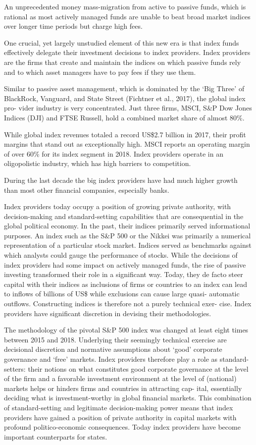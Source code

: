 \documentclass[
]{book}
\begin{document}
An unprecedented
money mass-migration from active to passive funds, which is rational as most
actively managed funds are unable to beat broad market indices over longer time
periods but charge high fees.

One crucial, yet largely unstudied element of this new era is that
index funds effectively delegate their investment decisions to index providers. Index
providers are the firms that create and maintain the indices on which passive funds
rely and to which asset managers have to pay fees if they use them.

Similar to passive asset management, which is dominated by the `Big Three' of
BlackRock, Vanguard, and State Street (Fichtner et al., 2017), the global index pro-
vider industry is very concentrated. Just three firms, MSCI, S\&P Dow Jones Indices
(DJI) and FTSE Russell, hold a combined market share of almost 80\%.

While global index revenues totaled a record US\$2.7 billion in 2017,
their profit margins that stand out as exceptionally high.
MSCI reports an operating margin of over 60\% for its index segment in 2018.
Index providers operate in an oligopolistic industry,
which has high barriers to competition.

During the last decade the big index providers have had
much higher growth than most other financial companies, especially banks.

Index providers today occupy a position of growing
private authority, with decision-making and standard-setting capabilities that are
consequential in the global political economy. In the past, their indices primarily
served informational purposes. An index such as the S\&P 500 or the Nikkei was
primarily a numerical representation of a particular stock market. Indices served as
benchmarks against which analysts could gauge the performance of stocks. While
the decisions of index providers had some impact on actively managed funds, the
rise of passive investing transformed their role in a significant way. Today, they de
facto steer capital with their indices as inclusions of firms or countries to an
index can lead to inflows of billions of US\$ while exclusions can cause large quasi-
automatic outflows. Constructing indices is therefore not a purely technical exer-
cise. Index providers have significant discretion in devising their methodologies.

The methodology of the pivotal S\&P 500
index was changed at least eight times between 2015 and 2018. Underlying their
seemingly technical exercise are decisional discretion and normative assumptions
about `good' corporate governance and `free' markets. Index providers therefore
play a role as standard-setters: their notions on what constitutes good corporate
governance at the level of the firm and a favorable investment environment at the
level of (national) markets helps or hinders firms and countries in attracting cap-
ital, essentially deciding what is investment-worthy in global financial markets.
This combination of standard-setting and legitimate decision-making power means
that index providers have gained a position of private authority in capital markets
with profound politico-economic consequences.
Today index providers have become important counterparts for states.
\end{document}
